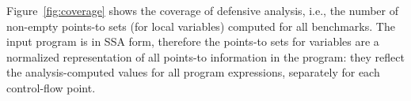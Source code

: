 



  Figure~\ref{fig:coverage} shows the coverage
of defensive analysis, i.e., the number of non-empty points-to sets
(for local variables) computed for all benchmarks. The input program
is in SSA form, therefore the points-to sets for variables are a
normalized representation of all points-to information in the program:
they reflect the analysis-computed values for all program expressions,
separately for each control-flow point.

